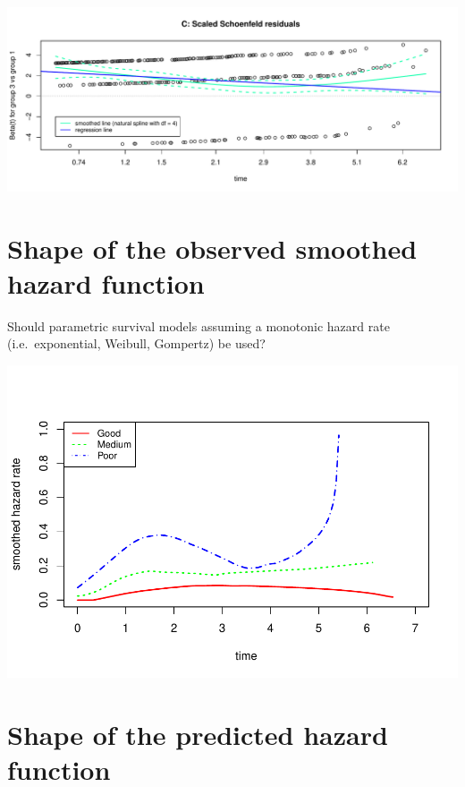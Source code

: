 \documentclass[]{article}
\begin{document}
\begin{flushleft}\includegraphics[height=0.29\textheight]{Images/PH_assumption-3} \end{flushleft}

\newpage

\section{Shape of the observed smoothed hazard
function}\label{shape-of-the-observed-smoothed-hazard-function}

Should parametric survival models assuming a monotonic hazard rate
(i.e.~exponential, Weibull, Gompertz) be used?

\begin{flushleft}\includegraphics{Images/plot_hr-1} \end{flushleft}

\newpage

\section{Shape of the predicted hazard
function}\label{shape-of-the-predicted-hazard-function}
\end{document}
